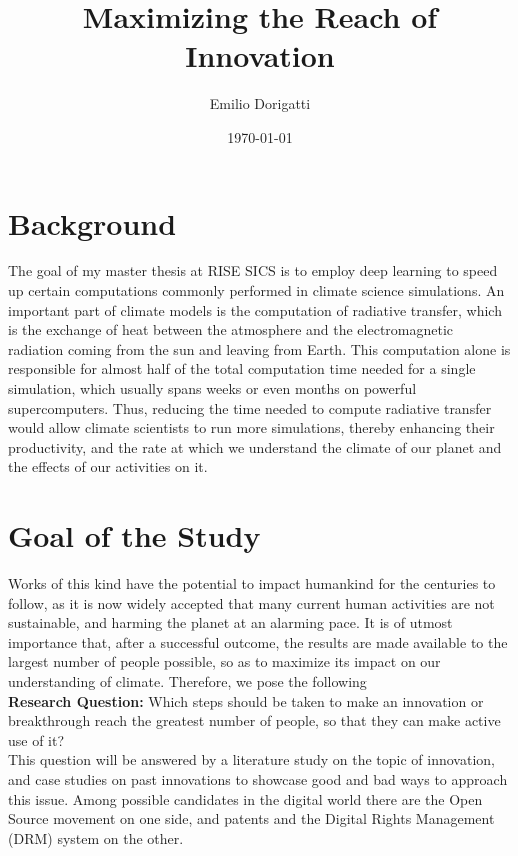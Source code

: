 \documentclass[12pt]{article}
\author{Emilio Dorigatti}
\date{\today}
\title{Maximizing the Reach of Innovation}
\begin{document}
\maketitle

\section{Background}
\label{sec:org749d376}
The goal of my master thesis at RISE SICS is to employ deep learning to speed up certain computations commonly performed in climate science simulations. An important part of climate models is the computation of radiative transfer, which is the exchange of heat between the atmosphere and the electromagnetic radiation coming from the sun and leaving from Earth. This computation alone is responsible for almost half of the total computation time needed for a single simulation, which usually spans weeks or even months on powerful supercomputers. Thus, reducing the time needed to compute radiative transfer would allow climate scientists to run more simulations, thereby enhancing their productivity, and the rate at which we understand the climate of our planet and the effects of our activities on it.

\section{Goal of the Study}
\label{sec:orgf15c407}
Works of this kind have the potential to impact humankind for the centuries to follow, as it is now widely accepted that many current human activities are not sustainable, and harming the planet at an alarming pace. It is of utmost importance that, after a successful outcome, the results are made available to the largest number of people possible, so as to maximize its impact on our understanding of climate. Therefore, we pose the following \\

\textbf{Research Question:} Which steps should be taken to make an innovation or breakthrough reach the greatest number of people, so that they can make active use of it? \\

This question will be answered by a literature study on the topic of innovation, and case studies on past innovations to showcase good and bad ways to approach this issue. Among possible candidates in the digital world there are the Open Source movement on one side, and patents and the Digital Rights Management (DRM) system on the other.
\end{document}
